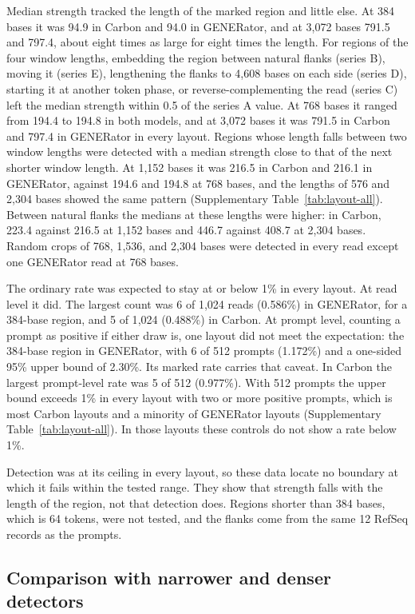 \documentclass[10pt,twocolumn]{article}
\begin{document}
Median strength tracked the length of the marked region and little else. At 384 bases it was 94.9
in Carbon and 94.0 in GENERator, and at 3{,}072 bases 791.5 and 797.4, about eight times as large
for eight times the length. For regions of the four window lengths, embedding the region between
natural flanks (series B), moving it (series E), lengthening the flanks to 4{,}608 bases on each
side (series D), starting it at another token phase, or reverse-complementing the read (series C)
left the median strength within 0.5 of the series A value. At 768 bases it ranged from 194.4 to
194.8 in both models, and at 3{,}072 bases it was 791.5 in Carbon and 797.4 in GENERator in every
layout. Regions whose length falls between two window lengths were detected with a median strength
close to that of the next shorter window length. At 1{,}152 bases it was 216.5 in Carbon and 216.1 in
GENERator, against 194.6 and 194.8 at 768 bases, and the lengths of 576 and 2{,}304 bases showed the same pattern (Supplementary Table~\ref{tab:layout-all}). Between natural flanks the
medians at these lengths were higher: in Carbon, 223.4 against 216.5 at 1{,}152 bases and 446.7
against 408.7 at 2{,}304 bases. Random crops of 768, 1{,}536, and 2{,}304
bases were detected in every read except one GENERator read at 768 bases.

The ordinary rate was expected to stay at or below 1\% in every layout. At read level it did. The
largest count was 6 of 1{,}024 reads (0.586\%) in GENERator, for a 384-base region, and 5 of 1{,}024
(0.488\%) in Carbon. At prompt level, counting a prompt as positive if either draw is, one layout did not meet the
expectation: the 384-base region in GENERator, with 6 of 512 prompts (1.172\%) and a one-sided
95\% upper bound of 2.30\%. Its marked rate carries that caveat. In Carbon the largest prompt-level rate was 5 of 512
(0.977\%). With 512 prompts the upper bound exceeds 1\% in every layout with two or more positive prompts,
which is most Carbon layouts and a minority of GENERator layouts
(Supplementary Table~\ref{tab:layout-all}). In those layouts these controls do not show a rate
below 1\%.

Detection was at its ceiling in every layout, so these data locate no boundary at which it fails
within the tested range. They show that strength falls with the length of the region, not that
detection does. Regions shorter than 384 bases, which is 64 tokens, were not tested, and the flanks
come from the same 12 RefSeq records as the prompts.

\subsection{Comparison with narrower and denser detectors}
\label{sec:detector-comparison}
\end{document}
